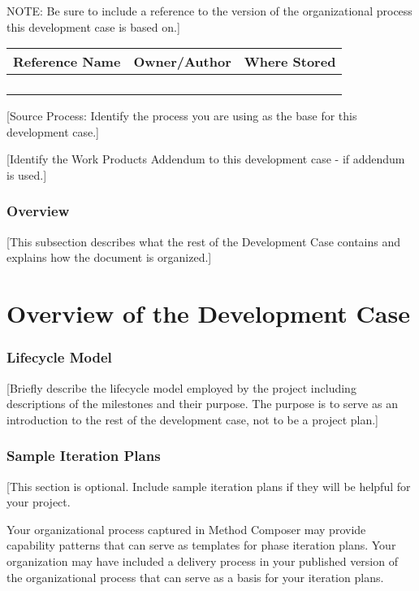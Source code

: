 NOTE: Be sure to include a reference to the version of the organizational process this development case is based on.]

\begin{tabular}{|c|c|c|}
    \hline
    Reference Name & Owner/Author & Where Stored\\ \hline
    && \\ \hline
    && \\ \hline
    && \\ \hline
    && \\ \hline
\end{tabular}


[Source Process: Identify the process you are using as the base for this development case.]

[Identify the Work Products Addendum to this development case - if addendum is used.]
 	
\subsubsection*{Overview}
[This subsection describes what the rest of the Development Case contains and explains how the document is organized.]

\section*{Overview of the Development Case}

\subsubsection*{Lifecycle Model}
[Briefly describe the lifecycle model employed by the project including descriptions of the milestones and their purpose. The purpose is to serve as an introduction to the rest of the development case, not to be a project plan.]

\subsubsection*{Sample Iteration Plans}
[This section is optional. Include sample iteration plans if they will be helpful for your project.

Your organizational process captured in Method Composer may provide capability patterns that can serve as templates for phase iteration plans. Your organization may have included a delivery process in your published version of the organizational process that can serve as a basis for your iteration plans.

